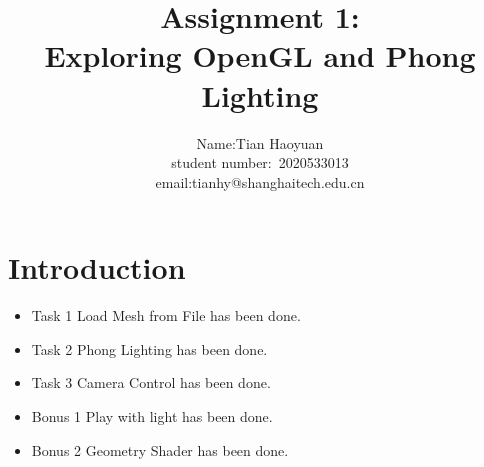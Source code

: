 \documentclass[acmtog]{acmart}
\title{Assignment 1:\\ {Exploring OpenGL and Phong Lighting}}
\author{Name:\quad Tian Haoyuan  \\ student number:\ 2020533013
\\email:\quad tianhy@shanghaitech.edu.cn}
\begin{document}
\maketitle

\section{Introduction}
\begin{itemize}
\item Task 1 Load Mesh from File has been done.
\item Task 2 Phong Lighting has been done.
\item Task 3 Camera Control has been done.
\item Bonus 1 Play with light has been done.
\item Bonus 2 Geometry Shader has been done.
\end{itemize}
\end{document}
